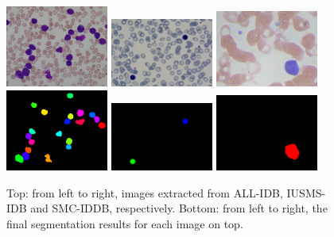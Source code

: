\documentclass[final,a4paper,12pt,english]{UnicaPhdThesis3}
\begin{document}
\begin{figure}[!htbp]
	\centering
	\includegraphics[height=0.2\textwidth, width=0.3\textwidth]{images/2018_1_visapp/015_1.png}
	\includegraphics[height=0.2\textwidth, width=0.3\textwidth]{images/2018_1_visapp/064.jpg}
	\includegraphics[height=0.2\textwidth, width=0.3\textwidth]{images/2018_1_visapp/037.jpg}
	\includegraphics[height=0.2\textwidth, width=0.3\textwidth]{images/2018_1_visapp/015_1seg.png}
	\includegraphics[height=0.2\textwidth, width=0.3\textwidth]{images/2018_1_visapp/064seg.jpg}
	\includegraphics[height=0.2\textwidth, width=0.3\textwidth]{images/2018_1_visapp/037seg.jpg}
	\caption{Top: from left to right, images extracted from ALL-IDB, IUSMS-IDB and SMC-IDDB, respectively. Bottom: from left to right, the final segmentation results for each image on top.}
	\label{segmentationThreeDB}
\end{figure}
\end{document}
